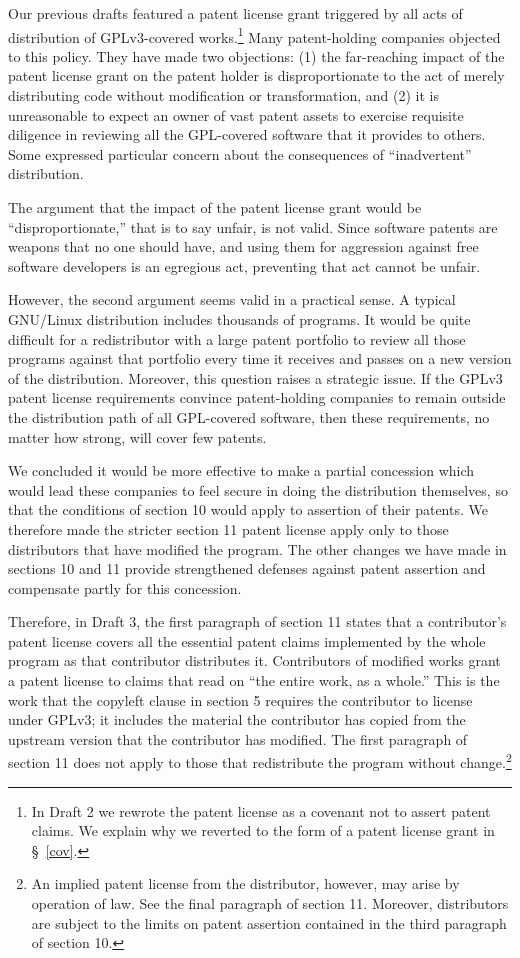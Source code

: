 Our previous drafts featured a patent license grant triggered by all
acts of distribution of GPLv3-covered works.\footnote{In Draft 2 we
rewrote the patent license as a covenant not to assert patent claims. We
explain why we reverted to the form of a patent license grant in \S\
\ref{cov}.} Many patent-holding companies objected to this policy. They
have made two objections: (1) the far-reaching impact of the patent
license grant on the patent holder is disproportionate to the act of
merely distributing code without modification or transformation, and (2)
it is unreasonable to expect an owner of vast patent assets to exercise
requisite diligence in reviewing all the GPL-covered software that it
provides to others.  Some expressed particular concern about the
consequences of ``inadvertent'' distribution.

The argument that the impact of the patent license grant would be
``disproportionate,'' that is to say unfair, is not valid. Since
software patents are weapons that no one should have, and using them for
aggression against free software developers is an egregious act,
preventing that act cannot be unfair. 

However, the second argument seems valid in a practical sense.  A
typical GNU/Linux distribution includes thousands of programs. It would
be quite difficult for a redistributor with a large patent portfolio to
review all those programs against that portfolio every time it receives
and passes on a new version of the distribution. Moreover, this question
raises a strategic issue. If the GPLv3 patent license requirements
convince patent-holding companies to remain outside the distribution
path of all GPL-covered software, then these requirements, no matter how
strong, will cover few patents. 

We concluded it would be more effective to make a partial concession
which would lead these companies to feel secure in doing the
distribution themselves, so that the conditions of section 10 would
apply to assertion of their patents.  We therefore made the stricter
section 11 patent license apply only to those distributors that have
modified the program.  The other changes we have made in sections 10 and
11 provide strengthened defenses against patent assertion and compensate
partly for this concession. 

Therefore, in Draft 3, the first paragraph of section 11 states that a
contributor's patent license covers all the essential patent claims
implemented by the whole program as that contributor distributes it.
Contributors of modified works grant a patent license to claims that
read on ``the entire work, as a whole.'' This is the work that the
copyleft clause in section 5 requires the contributor to license under
GPLv3; it includes the material the contributor has copied from the
upstream version that the contributor has modified.  The first paragraph
of section 11 does not apply to those that redistribute the program
without change.\footnote{An implied patent license from the distributor,
however, may arise by operation of law. See the final paragraph of
section 11.  Moreover, distributors are subject to the limits on patent
assertion contained in the third paragraph of section 10.} 

